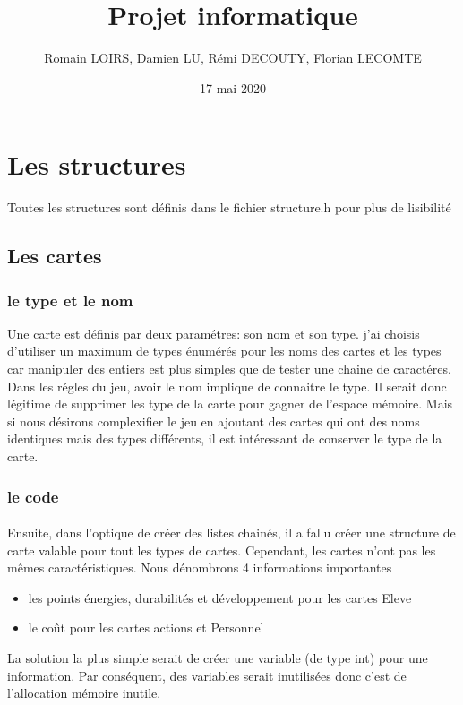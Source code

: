 \documentclass[12pt]{article}
\title{Projet informatique}
\author{Romain LOIRS, Damien LU, Rémi DECOUTY, Florian LECOMTE}
\date{17 mai 2020}
\begin{document}
\maketitle

\tableofcontents

\newpage

\section{Les structures}

Toutes les structures sont définis dans le fichier structure.h pour plus de lisibilit\'e

\subsection{Les cartes}

\subsubsection{le type et le nom}

 Une carte est définis par deux paramétres: son nom et son type. j'ai choisis d'utiliser un maximum de types \'enum\'er\'es pour les noms des cartes et les types car manipuler des entiers est plus simples que de tester une chaine de caract\'eres. Dans les régles du jeu, avoir le nom implique de connaitre le type. Il serait donc légitime de supprimer les type de la carte pour gagner de l'espace mémoire. Mais si nous désirons complexifier le jeu en ajoutant des cartes qui ont des noms identiques mais des types différents, il est intéressant de conserver le type de la carte.
 
\subsubsection{le code}

\paragraph{}
 Ensuite, dans l'optique de créer des listes chainés, il a fallu créer une structure de carte valable pour tout les types de cartes. Cependant, les cartes n'ont pas les mêmes caractéristiques. Nous dénombrons 4 informations importantes 
 \begin{itemize}
 	\item les points énergies, durabilités et développement pour les cartes Eleve
 	\item le coût pour les cartes actions et Personnel
 \end{itemize}
 La solution la plus simple serait de créer une  variable (de type int) pour une information. Par conséquent, des variables serait inutilisées donc c'est de l'allocation mémoire inutile.
 
\end{document}
